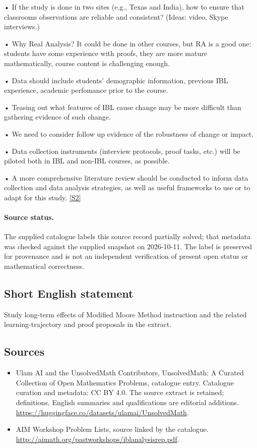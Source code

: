 \documentclass[11pt]{article}
\newcommand{\sref}[2]{\hyperlink{source:#1:#2}{[S#2]}}
\begin{document}
• If the study is done in two sites (e.g., Texas and India), how to ensure that classrooms observations are reliable and consistent? (Ideas: video, Skype interviews.)

• Why Real Analysis? It could be done in other courses, but RA is a good one: students have some experience with proofs, they are more mature mathematically, course content is challenging enough.

• Data should include students' demographic information, previous IBL experience, academic perfomance prior to the course.

• Teasing out what features of IBL cause change may be more difficult than gathering evidence of such change.

• We need to consider follow up evidence of the robustness of change or impact.

• Data collection instruments (interview protocols, proof tasks, etc.) will be piloted both in IBL and non-IBL courses, as possible.

• A more comprehensive literature review should be conducted to inform data collection and data analysis strategies, as well as useful frameworks to use or to adapt for this study. \sref{statement}{2}
\paragraph{Source status.}
The supplied catalogue labels this source record partially solved; that metadata was checked against the supplied snapshot on 2026-10-11. The label is preserved for provenance and is not an independent verification of present open status or mathematical correctness.
\subsection{Short English statement}
Study long-term effects of Modified Moore Method instruction and the related learning-trajectory and proof proposals in the extract.
\subsection{Sources}
\begin{itemize}
\item[\hypertarget{source:statement:1}{S1}] Ulam AI and the UnsolvedMath Contributors, UnsolvedMath: A Curated Collection of Open Mathematics Problems, catalogue entry. Catalogue curation and metadata: CC BY 4.0. The source extract is retained; definitions, English summaries and qualifications are editorial additions.
\url{https://huggingface.co/datasets/ulamai/UnsolvedMath}.
\item[\hypertarget{source:statement:2}{S2}] AIM Workshop Problem Lists, source linked by the catalogue.
\url{http://aimath.org/pastworkshops/iblanalysisrep.pdf}.
\end{itemize}
\end{document}
